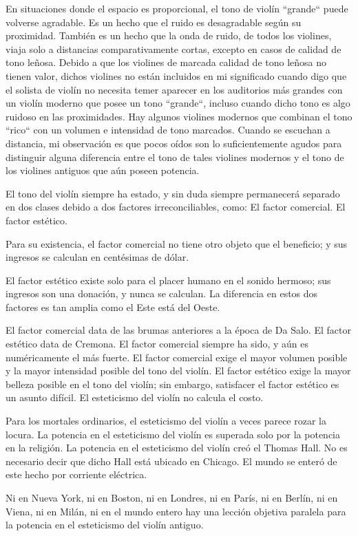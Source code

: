 \documentclass[12pt]{book}
\begin{document}
En situaciones donde el espacio es proporcional, el tono de violín ``grande`` puede volverse agradable. Es un hecho que el ruido es desagradable según su proximidad. También es un hecho que la onda de ruido, de todos los violines, viaja solo a distancias comparativamente cortas, excepto en casos de calidad de tono leñosa. Debido a que los violines de marcada calidad de tono leñosa no tienen valor, dichos violines no están incluidos en mi significado cuando digo que el solista de violín no necesita temer aparecer en los auditorios más grandes con un violín moderno que posee un tono ``grande``, incluso cuando dicho tono es algo ruidoso en las proximidades. Hay algunos violines modernos que combinan el tono ``rico`` con un volumen e intensidad de tono marcados. Cuando se escuchan a distancia, mi observación es que pocos oídos son lo suficientemente agudos para distinguir alguna diferencia entre el tono de tales violines modernos y el tono de los violines antiguos que aún poseen potencia.

El tono del violín siempre ha estado, y sin duda siempre permanecerá separado en dos clases debido a dos factores irreconciliables, como: El factor comercial. El factor estético.

Para su existencia, el factor comercial no tiene otro objeto que el beneficio; y sus ingresos se calculan en centésimas de dólar.

El factor estético existe solo para el placer humano en el sonido hermoso; sus ingresos son una donación, y nunca se calculan. La diferencia en estos dos factores es tan amplia como el Este está del Oeste.

El factor comercial data de las brumas anteriores a la época de Da Salo. El factor estético data de Cremona. El factor comercial siempre ha sido, y aún es numéricamente el más fuerte. El factor comercial exige el mayor volumen posible y la mayor intensidad posible del tono del violín. El factor estético exige la mayor belleza posible en el tono del violín; sin embargo, satisfacer el factor estético es un asunto difícil. El esteticismo del violín no calcula el costo.

Para los mortales ordinarios, el esteticismo del violín a veces parece rozar la locura. La potencia en el esteticismo del violín es superada solo por la potencia en la religión. La potencia en el esteticismo del violín creó el Thomas Hall. No es necesario decir que dicho Hall está ubicado en Chicago. El mundo se enteró de este hecho por corriente eléctrica.

Ni en Nueva York, ni en Boston, ni en Londres, ni en París, ni en Berlín, ni en Viena, ni en Milán, ni en el mundo entero hay una lección objetiva paralela para la potencia en el esteticismo del violín antiguo.
\end{document}
